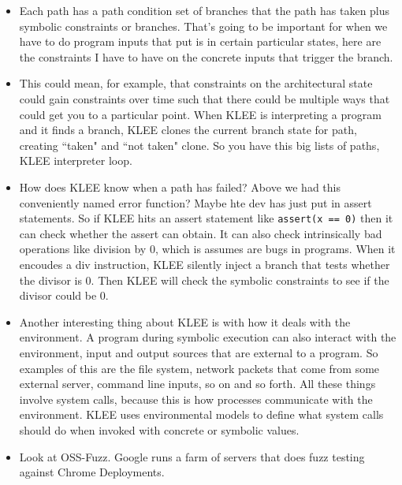 \documentclass[12pt]{article}
\theoremstyle{definition}
\begin{document}
\begin{itemize}
    \item Each path has a path condition set of branches that the path has taken plus symbolic constraints or branches. That's going to be important for when we have to do program inputs that put is in certain particular states, here are the constraints I have to have on the concrete inputs that trigger the branch.

    \item This could mean, for example, that constraints on the architectural state could gain constraints over time such that there could be multiple ways that could get you to a particular point. When KLEE is interpreting a program and it finds a branch, KLEE clones the current branch state for path, creating ``taken" and ``not taken" clone. So you have this big lists of paths, KLEE interpreter loop.

    \item How does KLEE know when a path has failed? Above we had this conveniently named error function? Maybe hte dev has just put in assert statements. So if KLEE hits an assert statement like \texttt{assert(x == 0)} then it can check whether the assert can obtain. It can also check intrinsically bad operations like division by 0, which is assumes are bugs in programs. When it encoudes a div instruction, KLEE silently inject a branch that tests whether the divisor is 0. Then KLEE will check the symbolic constraints to see if the divisor could be 0.

    \item Another interesting thing about KLEE is with how it deals with the environment. A program during symbolic execution can also interact with the environment, input and output sources that are external to a program. So examples of this are the file system, network packets that come from some external server, command line inputs, so on and so forth. All these things involve system calls, because this is how processes communicate with the environment. KLEE uses environmental models to define what system calls should do when invoked with concrete or symbolic values.

    \item Look at OSS-Fuzz. Google runs a farm of servers that does fuzz testing against Chrome Deployments.

\end{itemize}
\end{document}
